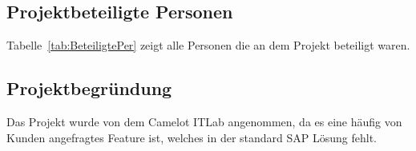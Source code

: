 \subsection{Projektbeteiligte Personen} 
\label{sec:Projektbeteiligte Personen}
Tabelle~\ref{tab:BeteiligtePer} zeigt alle Personen die an dem Projekt beteiligt waren.


\subsection{Projektbegründung} 
\label{sec:Projektbegruendung}
Das Projekt wurde von dem Camelot ITLab angenommen, da es eine häufig von Kunden angefragtes Feature ist, welches in der standard SAP Lösung fehlt.   